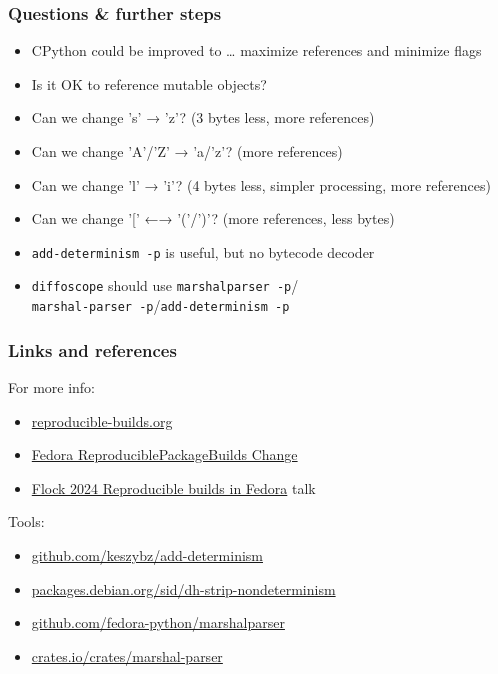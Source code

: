 \documentclass[]{beamer}
\begin{document}
\begin{frame}
  \frametitle{Questions \& further steps}

  \begin{itemize}
    \pause
  \item CPython could be improved to … maximize references and minimize flags
    \pause
  \item Is it OK to reference mutable objects?
    \pause
  \item Can we change 's' → 'z'? (3 bytes less, more references)
    \pause
  \item Can we change 'A'/'Z' → 'a/'z'? (more references)
    \pause
  \item Can we change 'l' → 'i'? (4 bytes less, simpler processing, more references)
    \pause
  \item Can we change '[' ←→ '('/')'? (more references, less bytes)
  \end{itemize}

  \begin{itemize}
    \pause
  \item \texttt{add-determinism -p} is useful\pause, but no bytecode decoder
    \pause
  \item \texttt{diffoscope} should use \texttt{marshalparser -p}/\\
      \texttt{marshal-parser -p}/\texttt{add-determinism -p}
  \end{itemize}
\end{frame}

\begin{frame}
  \frametitle{Links and references}
  
  For more info:
  \begin{itemize}
  \item \href{https://reproducible-builds.org}{reproducible-builds.org}
  \item \href{https://fedoraproject.org/wiki/Changes/ReproduciblePackageBuilds}{Fedora ReproduciblePackageBuilds Change}
  \item \href{https://www.youtube.com/watch?v=nJHh-VJnGt8}{Flock 2024 Reproducible builds in Fedora} talk
  \end{itemize}

  Tools:
  \begin{itemize}
  \item \href{https://github.com/keszybz/add-determinism}{github.com/keszybz/add-determinism}
  \item \href{https://packages.debian.org/sid/dh-strip-nondeterminism}{packages.debian.org/sid/dh-strip-nondeterminism}
  \item \href{https://github.com/fedora-python/marshalparser}{github.com/fedora-python/marshalparser}
  \item \href{https://crates.io/crates/marshal-parser}{crates.io/crates/marshal-parser}
  \end{itemize}
\end{frame}
\end{document}
